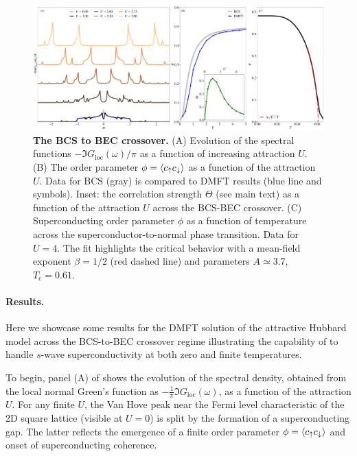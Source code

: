 \documentclass[edipack_sp.tex]{subfiles}
\begin{document}
\begin{figure}[t!]
  \includegraphics[width=\linewidth]{figures/figAHM.pdf}
    \caption{\label{figEx2}%
      \textbf{The BCS to BEC crossover.}
      (A) Evolution of the spectral functions
      $-\Im{G_\mathrm{loc}(\omega)}/\pi$ as a function of increasing
      attraction $U$. 
      (B) The order parameter $\phi=\langle c_\uparrow c_\downarrow\rangle$ as a
      function of the attraction $U$. Data for BCS (gray) is compared
      to DMFT results (blue line and symbols). Inset: the correlation strength
      $\Theta$ (see main text) as a function of the
      attraction $U$ across the BCS-BEC crossover. 
      (C) Superconducting order
      parameter $\phi$ as a function of temperature across the
      superconductor-to-normal phase transition. Data for $U=4$. The
      fit highlights the critical behavior with a mean-field exponent
      $\beta=1/2$ (red dashed line) and parameters $A\simeq 3.7$, $T_\mathrm{c}=0.61$.       
        }
\end{figure}

\paragraph{Results.}
Here we showcase some results for the DMFT solution of the 
attractive Hubbard model across the BCS-to-BEC crossover regime \cite{Toschi2005PRB,Toschi2005NJP,Amaricci2014PRA} 
illustrating the capability of \NAME to handle $s$-wave 
superconductivity at both zero and finite temperatures.

To begin, panel (A) of  shows the evolution of the 
spectral density, obtained from the local normal Green's function as 
$-\tfrac{1}{\pi}\Im G_\mathrm{loc}(\omega)$, as a function of the 
attraction $U$. For any finite $U$, the Van Hove peak near the Fermi level characteristic of the 2D square lattice (visible at 
$U = 0$) is split by the formation of a superconducting gap. The latter reflects the emergence of a finite 
order parameter $\phi = \langle c_\uparrow c_\downarrow \rangle$ and onset of superconducting coherence.
\end{document}
